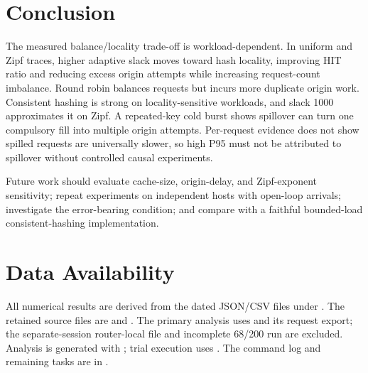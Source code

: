 \documentclass[conference]{IEEEtran}
\begin{document}
\section{Conclusion}
The measured balance/locality trade-off is workload-dependent. In uniform
and Zipf traces, higher adaptive slack moves toward hash locality, improving
HIT ratio and reducing excess origin attempts while increasing request-count
imbalance. Round robin balances requests but incurs more duplicate origin
work. Consistent hashing is strong on locality-sensitive workloads, and
slack 1000 approximates it on Zipf. A repeated-key cold burst shows spillover
can turn one compulsory fill into multiple origin attempts. Per-request
evidence does not show spilled requests are universally slower, so high P95
must not be attributed to spillover without controlled causal experiments.

Future work should evaluate cache-size, origin-delay, and Zipf-exponent
sensitivity; repeat experiments on independent hosts with open-loop arrivals;
investigate the error-bearing condition; and compare with a faithful
bounded-load consistent-hashing implementation.

\section*{Data Availability}
All numerical results are derived from the dated JSON/CSV files under
. The retained source files are
 and .
The primary analysis uses
 and its request export;
the separate-session router-local file and incomplete 68/200 run are
excluded. Analysis is generated with
; trial execution uses
. The command log and remaining tasks are
in .



\end{document}
